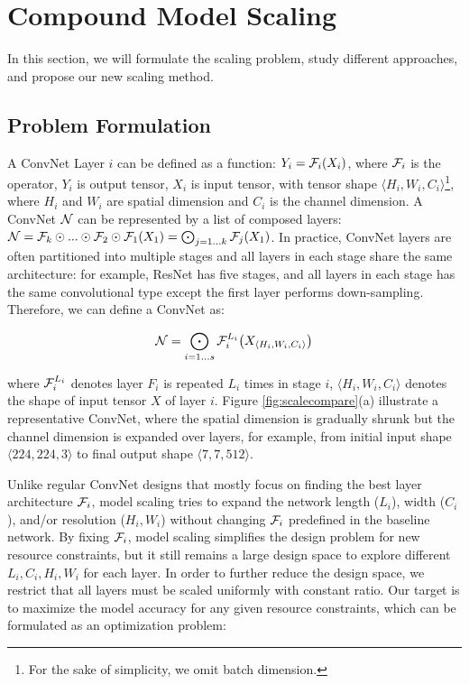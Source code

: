 \documentclass{article}
\begin{document}
\section{Compound Model Scaling}
\label{sec:study}
 
In this section, we will formulate the scaling problem,  study different approaches, and propose our new scaling method.

\subsection{Problem Formulation}
 
A ConvNet Layer $i$ can be defined as a function: $Y_i = \mathcal{F}_i(X_i)$, where $\mathcal{F}_i$ is the operator, $Y_i$ is output tensor, $X_i$ is input tensor, with tensor shape  $\langle H_i, W_i, C_i \rangle$\footnote{For the sake of simplicity, we omit batch dimension.}, where $H_i$ and $W_i$ are spatial dimension and $C_i$ is the channel dimension. A ConvNet $\mathcal{N}$ can be represented by a list of composed layers:  $\mathcal{N} = \mathcal{F}_k \odot ... \odot  \mathcal{F}_2 \odot \mathcal{F}_1 (X_1) = \bigodot_{j=1...k} \mathcal{F}_j (X_1)$.  In practice, ConvNet layers are often partitioned into multiple stages and all layers in each stage share the same architecture: for example,  ResNet \cite{resnet16} has five stages, and all layers in each stage has the same convolutional type except the first layer performs down-sampling. Therefore, we can define a ConvNet as:

\vspace{-0.1in}
\begin{equation}
\mathcal{N} = \bigodot_{i=1...s} \mathcal{F}_{i}^{L_i} \big(X_{\langle H_i, W_i, C_i \rangle}\big)
\end{equation}
\vspace{-0.1in}

where $\mathcal{F}_{i}^{L_i}$ denotes layer $F_{i}$ is repeated $L_i$ times in stage $i$,  $\langle H_i, W_i, C_i \rangle$ denotes the shape of input tensor $X$ of layer $i$.   Figure \ref{fig:scalecompare}(a) illustrate a representative ConvNet, where the spatial dimension is gradually shrunk but the channel dimension is  expanded over layers, for example, from  initial input shape $\langle 224, 224, 3 \rangle$ to  final output shape $\langle 7, 7, 512 \rangle$.

Unlike regular ConvNet designs that mostly focus on finding the best layer architecture $\mathcal{F}_i$, model scaling tries to expand the network length ($L_i$), width ($C_i$), and/or resolution ($H_i, W_i$) without changing $\mathcal{F}_i$ predefined in the baseline network.  By fixing $\mathcal{F}_i$, model scaling simplifies the design problem for new resource constraints, but it still remains a large design space to explore different $L_i, C_i, H_i, W_i$ for each layer.  In order to further reduce the design space, we restrict that all layers must be scaled uniformly with constant ratio. Our target is to maximize the model accuracy for any given resource constraints, which can be formulated as an optimization problem:
\end{document}
